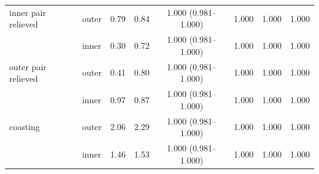 \begin{table}[htbp]
\begin{tabular*}{\textwidth}{@{\extracolsep{\fill}}llcccccc@{}}
inner pair relieved & outer & 0.79 & 0.84 & 1.000 (0.981--1.000) & 1.000 & 1.000 & 1.000 \\
 & inner & 0.30 & 0.72 & 1.000 (0.981--1.000) & 1.000 & 1.000 & 1.000 \\
outer pair relieved & outer & 0.41 & 0.80 & 1.000 (0.981--1.000) & 1.000 & 1.000 & 1.000 \\
 & inner & 0.97 & 0.87 & 1.000 (0.981--1.000) & 1.000 & 1.000 & 1.000 \\
coasting & outer & 2.06 & 2.29 & 1.000 (0.981--1.000) & 1.000 & 1.000 & 1.000 \\
 & inner & 1.46 & 1.53 & 1.000 (0.981--1.000) & 1.000 & 1.000 & 1.000 \\
\bottomrule
\end{tabular*}
\end{table}
